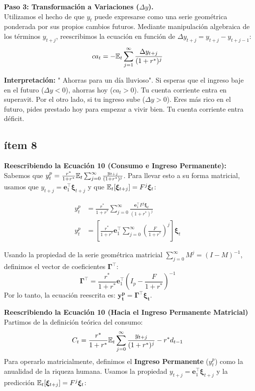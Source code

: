 \textbf{Paso 3: Transformación a Variaciones ($\Delta y$).} \\
Utilizamos el hecho de que $y_t$ puede expresarse como una serie geométrica ponderada por sus propios cambios futuros. Mediante manipulación algebraica de los términos $y_{t+j}$, reescribimos la ecuación en función de $\Delta y_{t+j} = y_{t+j} - y_{t+j-1}$:
\begin{equation}
    ca_t = -\mathbb{E}_t \sum_{j=1}^{\infty} \frac{\Delta y_{t+j}}{(1+r^*)^j}
\end{equation}

\textbf{Interpretación:} " Ahorras para un día lluvioso". Si esperas que el ingreso baje en el futuro ($\Delta y < 0$), ahorras hoy ($ca_t > 0$). Tu cuenta corriente entra en superavit. Por el otro lado, si tu ingreso sube ($\Delta y > 0$). Eres más rico en el futuro, pides prestado hoy para empezar a vivir bien. Tu cuenta corriente entra déficit.  

\subsection*{ítem 8}

\textbf{Reescribiendo la Ecuación 10 (Consumo e Ingreso Permanente):} \\
Sabemos que $y_t^p = \frac{r^*}{1+r^*} \mathbb{E}_t \sum_{j=0}^{\infty} \frac{y_{t+j}}{(1+r^*)^j}$. Para llevar esto a su forma matricial, usamos que $y_{t+j} = \mathbf{e}_1^\top \bm{\xi}_{t+j}$ y que $\mathbb{E}_t[\bm{\xi}_{t+j}] = F^j \bm{\xi}_t$:

\begin{align}
    y_t^p &= \frac{r^*}{1+r^*} \sum_{j=0}^{\infty} \frac{\mathbf{e}_1^\top F^j \bm{\xi}_t}{(1+r^*)^j} \\
    y_t^p &= \left[ \frac{r^*}{1+r^*} \mathbf{e}_1^\top \sum_{j=0}^{\infty} \left( \frac{F}{1+r^*} \right)^j \right] \bm{\xi}_t
\end{align}

Usando la propiedad de la serie geométrica matricial $\sum_{j=0}^{\infty} M^j = (I - M)^{-1}$, definimos el vector de coeficientes $\bm{\Gamma}^\top$:
\begin{equation}
    \bm{\Gamma}^\top = \frac{r^*}{1+r^*} \mathbf{e}_1^\top \left( I_p - \frac{F}{1+r^*} \right)^{-1}
\end{equation}
Por lo tanto, la ecuación reescrita es: $\bm{y_t^p = \bm{\Gamma}^\top \bm{\xi}_t}$.

\vspace{1em}
\vspace{1em}
\textbf{Reescribiendo la Ecuación 10 (Hacia el Ingreso Permanente Matricial)} \\
Partimos de la definición teórica del consumo:
\begin{equation}
    C_t = \frac{r^*}{1+r^*} \mathbb{E}_t \sum_{j=0}^{\infty} \frac{y_{t+j}}{(1+r^*)^j} - r^* d_{t-1}
\end{equation}
Para operarlo matricialmente, definimos el \textbf{Ingreso Permanente} ($y_t^p$) como la anualidad de la riqueza humana. Usamos la propiedad $y_{t+j} = \mathbf{e}_1^\top \bm{\xi}_{t+j}$ y la predicción $\mathbb{E}_t[\bm{\xi}_{t+j}] = F^j \bm{\xi}_t$:


